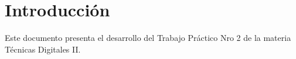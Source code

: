 \chapter{Introducción}
\label{ch:introduccion}

Este documento presenta el desarrollo del Trabajo Práctico Nro 2 de la materia Técnicas Digitales II.
